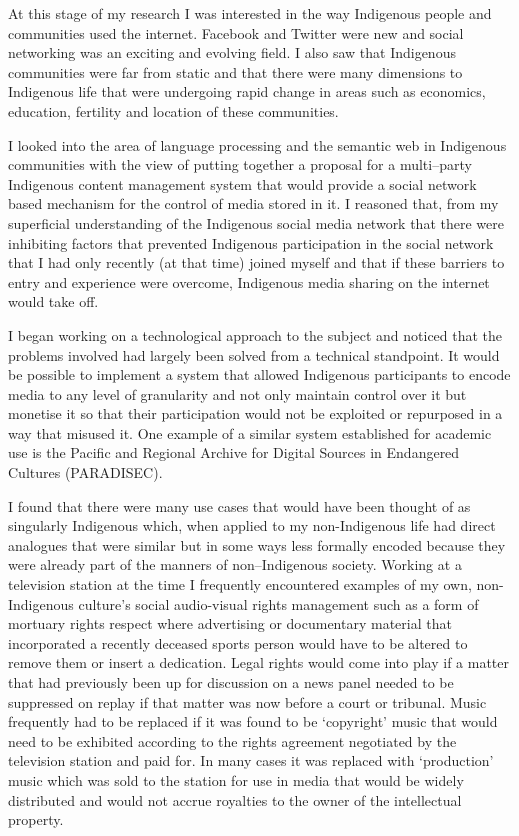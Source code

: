At this stage of my research I was interested in the way Indigenous people and communities used the internet. Facebook and Twitter were new and social networking was an exciting and evolving field. I also saw that Indigenous communities were far from static and that there were many dimensions to Indigenous life that were undergoing rapid change in areas such as economics, education, fertility and location of these communities.

I looked into the area of language processing and the semantic web in Indigenous communities with the view of putting together a proposal for a multi--party Indigenous content management system that would provide a social network based mechanism for the control of media stored in it. I reasoned that, from my superficial understanding of the Indigenous social media network that there were inhibiting factors that prevented Indigenous participation in the social network that I had only recently (at that time) joined myself and that if these barriers to entry and experience were overcome, Indigenous media sharing on the internet would take off. 

I began working on a technological approach to the subject and noticed that the problems involved had largely been solved from a technical standpoint. It would be possible to implement a system that allowed Indigenous participants to encode media to any level of granularity and not only maintain control over it but monetise it so that their participation would not be exploited or repurposed in a way that misused it. One example of a similar system established for academic use is the Pacific and Regional Archive for Digital Sources in Endangered Cultures (PARADISEC)\cite{RefWorks:422}.

I found that there were many use cases that would have been thought of as singularly Indigenous which, when applied to my non-Indigenous life had direct analogues that were similar but in some ways less formally encoded because they were already part of the manners of non--Indigenous society.  Working at a television station at the time I frequently encountered examples of my own, non-Indigenous culture's  social audio-visual rights management such as a form of mortuary rights respect where advertising or documentary material that incorporated a recently deceased sports person would have to be altered to remove them or insert a dedication. Legal rights would come into play if a matter that had previously been up for discussion on a news panel needed to be suppressed on replay if that matter was now before a court or tribunal. Music frequently had to be replaced if it was found to be `copyright' music that would need to be exhibited according to the rights agreement negotiated by the television station and paid for. In many cases it was replaced with `production' music which was sold to the station for use in media that would be widely distributed and would not accrue royalties to the owner of the intellectual property.

